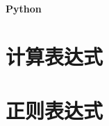 \documentclass{article}
\begin{document}
\begin{titlepage}

\thispagestyle{empty}
\pagebreak
\textbf{Python}
\pagestyle{plain}
\tableofcontents



\hspace{3em}
\section{﻿计算表达式}

\section{正则表达式}


\end{titlepage}
\end{document}
